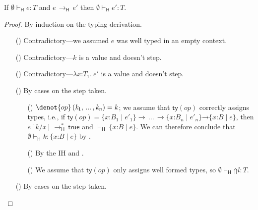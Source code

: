 \documentclass[9pt]{extarticle}
\newcommand{\ottnt}[1]{\mathit{#1}}
\newcommand{\ottmv}[1]{\mathit{#1}}
\newcommand{\ottsym}[1]{#1}
\begin{document}
{\begin{lemma}
  \label{lem:heedfulpreservation}
  If $ \emptyset   \vdash _{  \mathsf{H}  }  \ottnt{e}  :  \ottnt{T} $ and $\ottnt{e} \,  \longrightarrow _{  \mathsf{H}  }  \, \ottnt{e'}$ then $ \emptyset   \vdash _{  \mathsf{H}  }  \ottnt{e'}  :  \ottnt{T} $.
\begin{proof}
    By induction on the typing derivation.
{\iffull
    \begin{itemize}
    \item[(\T{Var})] Contradictory---we assumed $\ottnt{e}$ was well typed
      in an empty context.
    \item[(\T{Const})] Contradictory---$\ottnt{k}$ is a value and doesn't step.
    \item[(\T{Abs})] Contradictory---$ \lambda \mathit{x} \mathord{:} \ottnt{T_{{\mathrm{1}}}} .~  \ottnt{e'} $ is a value and
      doesn't step.
    \item[(\T{Op})] By cases on the step taken.
\begin{itemize}
      \item[(\E{Op})] $\denot{ op } \, \ottsym{(}  \ottnt{k_{{\mathrm{1}}}}  \ottsym{,} \, ... \, \ottsym{,}  \ottnt{k_{\ottmv{n}}}  \ottsym{)}  \ottsym{=}  \ottnt{k}$; we assume that
        $ \mathsf{ty} (\mathord{ \ottnt{op} }) $ correctly assigns types, i.e., if $ \mathsf{ty} (\mathord{ \ottnt{op} })   \ottsym{=}   {}   \{ \mathit{x} \mathord{:} \ottnt{B_{{\mathrm{1}}}} \mathrel{\mid} \ottnt{e'_{{\mathrm{1}}}} \}   \rightarrow \, ... \, \rightarrow   \{ \mathit{x} \mathord{:} \ottnt{B_{\ottmv{n}}} \mathrel{\mid} \ottnt{e'_{\ottmv{n}}} \}   {} \mathord{ \rightarrow }  \{ \mathit{x} \mathord{:} \ottnt{B} \mathrel{\mid} \ottnt{e} \}  $, then $ \ottnt{e}  [  \ottnt{k} / \mathit{x}  ]  \,  \longrightarrow ^{*}_{  \mathsf{H}  }  \,  \mathsf{true} $ and $ \mathord{  \vdash _{  \mathsf{H}  } }~  \{ \mathit{x} \mathord{:} \ottnt{B} \mathrel{\mid} \ottnt{e} \}  $. We can therefore conclude
        that $ \emptyset   \vdash _{  \mathsf{H}  }  \ottnt{k}  :   \{ \mathit{x} \mathord{:} \ottnt{B} \mathrel{\mid} \ottnt{e} \}  $ by .
      \item[(\E{OpInner})] By the IH and .
      \item[(\E{OpRaise})] We assume that $ \mathsf{ty} (\mathord{ \ottnt{op} }) $ only assigns
        well formed types, so $ \emptyset   \vdash _{  \mathsf{H}  }   \mathord{\Uparrow}  \ottnt{l}   :  \ottnt{T} $.
      \end{itemize}
    \item[(\T{App})] By cases on the step taken.

\end{itemize}}
\end{proof}
\end{lemma}}
\end{document}
